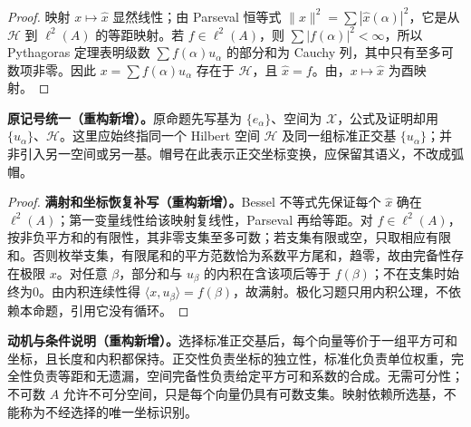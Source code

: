 \documentclass[../../main.tex]{subfiles}
\begin{document}
\begin{proof}
映射 $x\mapsto\widehat x$ 显然线性；由 Parseval 恒等式 $\|x\|^2=\sum|\widehat x(\alpha)|^2$，它是从 $\mathscr H$ 到 $\ell^2(A)$ 的等距映射。若 $f\in\ell^2(A)$，则 $\sum|f(\alpha)|^2<\infty$，所以 Pythagoras 定理表明级数 $\sum f(\alpha)u_\alpha$ 的部分和为 Cauchy 列，其中只有至多可数项非零。因此 $x=\sum f(\alpha)u_\alpha$ 存在于 $\mathscr H$，且 $\widehat x=f$。由，$x\mapsto\widehat x$ 为酉映射。
\end{proof}
\begin{remark}
\textbf{原记号统一（重构新增）。}原命题先写基为 $\{e_\alpha\}$、空间为 $\mathscr X$，公式及证明却用 $\{u_\alpha\}$、$\mathscr H$。这里应始终指同一个 Hilbert 空间 $\mathscr H$ 及同一组标准正交基 $\{u_\alpha\}$；并非引入另一空间或另一基。帽号在此表示正交坐标变换，应保留其语义，不改成弧帽。
\end{remark}
\begin{proof}
\textbf{满射和坐标恢复补写（重构新增）。}Bessel 不等式先保证每个 $\widehat x$ 确在 $\ell^2(A)$；第一变量线性给该映射复线性，Parseval 再给等距。对 $f\in\ell^2(A)$，按非负平方和的有限性，其非零支集至多可数；若支集有限或空，只取相应有限和。否则枚举支集，有限尾和的平方范数恰为系数平方尾和，趋零，故由完备性存在极限 $x$。对任意 $\beta$，部分和与 $u_\beta$ 的内积在含该项后等于 $f(\beta)$；不在支集时始终为0。由内积连续性得 $\langle x,u_\beta\rangle=f(\beta)$，故满射。极化习题只用内积公理，不依赖本命题，引用它没有循环。
\end{proof}
\begin{remark}
\textbf{动机与条件说明（重构新增）。}选择标准正交基后，每个向量等价于一组平方可和坐标，且长度和内积都保持。正交性负责坐标的独立性，标准化负责单位权重，完全性负责等距和无遗漏，空间完备性负责给定平方可和系数的合成。无需可分性；不可数 $A$ 允许不可分空间，只是每个向量仍具有可数支集。映射依赖所选基，不能称为不经选择的唯一坐标识别。
\end{remark}

\end{document}
